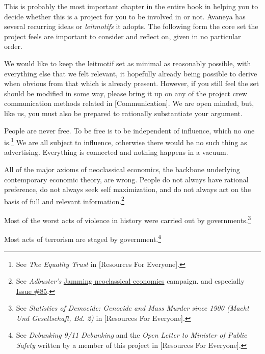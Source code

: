 

This is probably the most important chapter in the entire book in helping you to decide whether this is a project for you to be involved in or not. Avaneya has several recurring ideas or {\it leitmotifs} it adopts. The following form the core set the project feels are important to consider and reflect on, given in no particular order.

We would like to keep the leitmotif set as minimal as reasonably possible, with everything else that we felt relevant, it hopefully already being possible to derive when obvious from that which is already present. However, if you still feel the set should be modified in some way, please bring it up on any of the project crew communication methods related in [Communication]. We are open minded, but, like us, you must also be prepared to rationally substantiate your argument.

\startitemize[4]
\setupwhitespace[big]
\item
People are never free. To be free is to be independent of influence, which no one is.\footnote{See {\it The Equality Trust} in [Resources For Everyone].} We are all subject to influence, otherwise there would be no such thing as advertising. Everything is connected and nothing happens in a vacuum.

\item
All of the major axioms of neoclassical economics, the backbone underlying contemporary economic theory, are wrong. People do not always have rational preference, do not always seek self maximization, and do not always act on the basis of full and relevant information.\footnote{See {\it Adbuster's} \href{http://anticap.wordpress.com/2010/10/25/jamming-neoclassical-economics/}{Jamming neoclassical economics} campaign. and especially \href{http://www.adbusters.org/cultureshop/backissues/85}{Issue \#85}.}

\item
Most of the worst acts of violence in history were carried out by governments.\footnote{See {\it Statistics of Democide: Genocide and Mass Murder since 1900 (Macht Und Gesellschaft, Bd. 2)} in [Resources For Everyone].}

\item
Most acts of terrorism are staged by government.\footnote{See {\it Debunking 9/11 Debunking} and the {\it Open Letter to Minister of Public Safety} written by a member of this project in [Resources For Everyone].}

